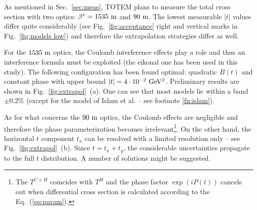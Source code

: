 \documentclass{desyproc}
\def\be{\beta}
\def\un#1{\ {\rm #1}}
\begin{document}
\iffalse
\begin{figure}[htb]
\centerline{\hss
	\texttt{[image: ../fig/coulombInterference\_lin\_bw]}\hfil
	\texttt{[image: ../fig/R\_bw]}\hss
}%
\caption{Left: An illustration of Coulomb-hadron interference effects. Right: A comparison of West-Yennie and eikonal interference formulae (for $E=14\un{TeV}$). Acceptance starting points are also marked.}%
\label{fig:coulomb}%
\end{figure}
\fi

As mentioned in Sec.~\ref{sec:meas}, TOTEM plans to measure the total cross section with two optics: $\be^* = 1535\un{m}$ and $90\un{m}$. The lowest measurable $|t|$ values differ quite considerably (see Fig.~\ref{fig:acceptance} right and vertical marks in Fig.~\ref{fig:models low}) and therefore the extrapolation strategies differ as well.

For the $1535\un{m}$ optics, the Coulomb interference effects play a role and thus an interference formula must be exploited (the eikonal one has been used in this study). The following configuration has been found optimal: quadratic $B(t)$ and constant phase with upper bound $|t| = 4\cdot10^{-2}\un{GeV^2}$. Preliminary results are shown in Fig.~\ref{fig:extrapol}~(a). One can see that most models lie within a band $\pm 0.2\%$ (except for the model of Islam et al. -- see footnote \ref{fn:islam}).

As for what concerns the $90\un{m}$ optics, the Coulomb effects are negligible and therefore the phase parameterization becomes irrelevant\footnote{%
The $T^{C+H}$ coincides with $T^H$ and the phase factor $\exp{(i P(t))}$ cancels out when differential cross section is calculated according to the Eq.~(\ref{eq:param}).
}. On the other hand, the horizontal $t$ component $t_x$  can be resolved with a limited resolution only -- see Fig.~\ref{fig:extrapol}~(b). Since $t = t_x + t_y$, the considerable uncertainties propagate to the full $t$ distribution. A number of solutions might be suggested.
\end{document}

